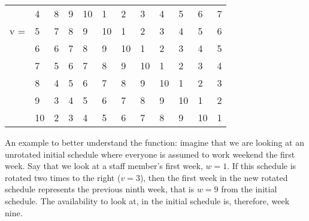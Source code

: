 \begin{table}[H]
\begin{tabular}{llllllllllll}
    & \multicolumn{1}{l|}{4}  & \multicolumn{1}{l|}{8}  & \multicolumn{1}{l|}{9}  & \multicolumn{1}{l|}{10} & \multicolumn{1}{l|}{1}  & \multicolumn{1}{l|}{2}  & \multicolumn{1}{l|}{3}  & \multicolumn{1}{l|}{4}  & \multicolumn{1}{l|}{5}  & \multicolumn{1}{l|}{6}  & \multicolumn{1}{l|}{7}  \\ \cline{3-12} 
v = & \multicolumn{1}{l|}{5}  & \multicolumn{1}{l|}{7}  & \multicolumn{1}{l|}{8}  & \multicolumn{1}{l|}{9}  & \multicolumn{1}{l|}{10} & \multicolumn{1}{l|}{1}  & \multicolumn{1}{l|}{2}  & \multicolumn{1}{l|}{3}  & \multicolumn{1}{l|}{4}  & \multicolumn{1}{l|}{5}  & \multicolumn{1}{l|}{6}  \\ \cline{3-12} 
    & \multicolumn{1}{l|}{6}  & \multicolumn{1}{l|}{6}  & \multicolumn{1}{l|}{7}  & \multicolumn{1}{l|}{8}  & \multicolumn{1}{l|}{9}  & \multicolumn{1}{l|}{10} & \multicolumn{1}{l|}{1}  & \multicolumn{1}{l|}{2}  & \multicolumn{1}{l|}{3}  & \multicolumn{1}{l|}{4}  & \multicolumn{1}{l|}{5}  \\ \cline{3-12} 
    & \multicolumn{1}{l|}{7}  & \multicolumn{1}{l|}{5}  & \multicolumn{1}{l|}{6}  & \multicolumn{1}{l|}{7}  & \multicolumn{1}{l|}{8}  & \multicolumn{1}{l|}{9}  & \multicolumn{1}{l|}{10} & \multicolumn{1}{l|}{1}  & \multicolumn{1}{l|}{2}  & \multicolumn{1}{l|}{3}  & \multicolumn{1}{l|}{4}  \\ \cline{3-12} 
    & \multicolumn{1}{l|}{8}  & \multicolumn{1}{l|}{4}  & \multicolumn{1}{l|}{5}  & \multicolumn{1}{l|}{6}  & \multicolumn{1}{l|}{7}  & \multicolumn{1}{l|}{8}  & \multicolumn{1}{l|}{9}  & \multicolumn{1}{l|}{10} & \multicolumn{1}{l|}{1}  & \multicolumn{1}{l|}{2}  & \multicolumn{1}{l|}{3}  \\ \cline{3-12} 
    & \multicolumn{1}{l|}{9}  & \multicolumn{1}{l|}{3}  & \multicolumn{1}{l|}{4}  & \multicolumn{1}{l|}{5}  & \multicolumn{1}{l|}{6}  & \multicolumn{1}{l|}{7}  & \multicolumn{1}{l|}{8}  & \multicolumn{1}{l|}{9}  & \multicolumn{1}{l|}{10} & \multicolumn{1}{l|}{1}  & \multicolumn{1}{l|}{2}  \\ \cline{3-12} 
    & \multicolumn{1}{l|}{10} & \multicolumn{1}{l|}{2}  & \multicolumn{1}{l|}{3}  & \multicolumn{1}{l|}{4}  & \multicolumn{1}{l|}{5}  & \multicolumn{1}{l|}{6}  & \multicolumn{1}{l|}{7}  & \multicolumn{1}{l|}{8}  & \multicolumn{1}{l|}{9}  & \multicolumn{1}{l|}{10} & \multicolumn{1}{l|}{1}  \\ \cline{3-12} 
\end{tabular}
\end{table}
An example to better understand the function: imagine that we are looking at an unrotated initial schedule where everyone is assumed to work weekend the first week. Say that we look at a staff member's first week, $w=1$. If this schedule is rotated two times to the right ($v=3$), then the first week in the new rotated schedule represents the previous ninth week, that is $w=9$ from the initial schedule. The availability to look at, in the initial schedule is, therefore, week nine.

